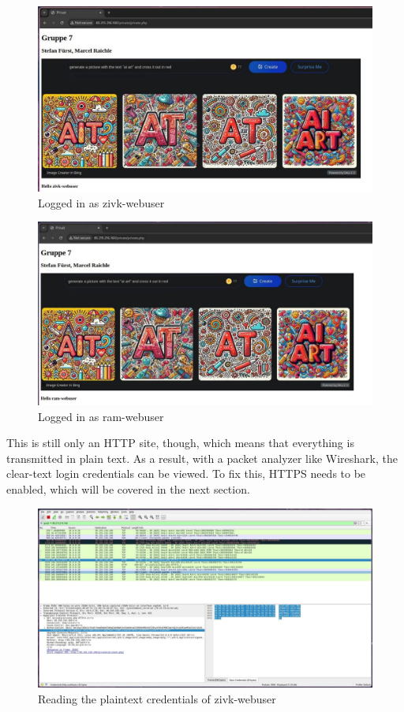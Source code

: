 \documentclass[a4paper]{article}
\begin{document}
\begin{figure}[!htbp]
	\includegraphics[scale=0.25]{images/zivk_webuser.png}
	\centering
	\caption{Logged in as zivk-webuser}
\end{figure}
\begin{figure}[!htbp]
	\includegraphics[scale=0.25]{images/ram_webuser.png}
	\centering
	\caption{Logged in as ram-webuser}
\end{figure}
\newpage
This is still only an HTTP site, though, which means that everything is transmitted in plain text. As a result, with a packet analyzer like Wireshark, the clear-text login credentials can be viewed. To fix this, HTTPS needs to be enabled, which will be covered in the next section.
\begin{figure}[!htbp]
	\includegraphics[scale=0.25]{images/zivk_snifa.png}
	\centering
	\caption{Reading the plaintext credentials of zivk-webuser}
\end{figure}
\end{document}
